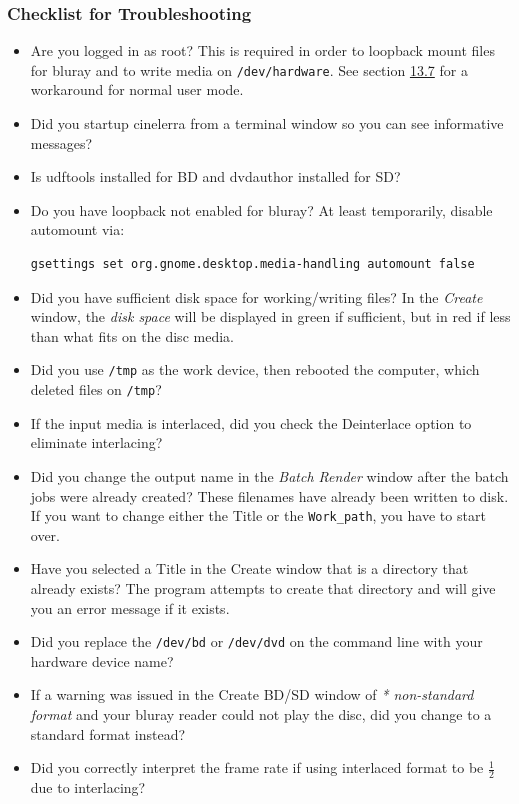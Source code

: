 \subsubsection*{Checklist for Troubleshooting}
\label{ssub:checklist_troubleshooting}

\begin{itemize}
    \item Are you logged in as root?  This is required in order to loopback mount files for bluray and to write media on \texttt{/dev/hardware}.  See section \hyperref[sec:bluray_workaround_mount_umount]{13.7} for a workaround for normal user mode.
    \item Did you startup cinelerra from a terminal window so you can see informative messages?
    \item Is udftools installed for BD and dvdauthor installed for SD?
    \item Do you have loopback not enabled for bluray?  At least temporarily, disable automount via:
    \begin{lstlisting}[language=bash,numbers=none]
    gsettings set org.gnome.desktop.media-handling automount false
    \end{lstlisting}
    \item Did you have sufficient disk space for working/writing files?  In the \textit{Create} window, the \textit{disk space} will be displayed in green if sufficient, but in red if less than what fits on the disc media.
    \item Did you use \texttt{/tmp} as the work device, then rebooted the computer, which deleted files on \texttt{/tmp}?
    \item If the input media is interlaced, did you check the Deinterlace option to eliminate interlacing?
    \item Did you change the output name in the \textit{Batch Render} window after the batch jobs were already created? These filenames have already been written to disk. If you want to change either the Title or the \texttt{Work\_path}, you have to start over.
    \item Have you selected a Title in the Create window that is a directory that already exists? The program attempts to create that directory and will give you an error message if it exists.
    \item Did you replace the \texttt{/dev/bd} or \texttt{/dev/dvd} on the command line with your hardware device name?
    \item If a warning was issued in the Create BD/SD window of \textit{* non-standard format} and your bluray reader could not play the disc, did you change to a standard format instead?
    \item Did you correctly interpret the frame rate if using interlaced format to be $\frac{1}{2}$ due to interlacing?
\end{itemize}

